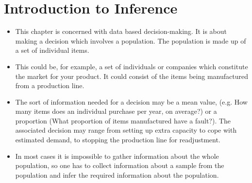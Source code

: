 \section{Introduction to Inference}
\begin{itemize}
\item This chapter is concerned with data based decision-making. It is about making a
decision which involves a population. The population is made up of a set of
individual items. 
\item This could be, for example, a set of individuals or companies which
constitute the market for your product. It could consist of the items being
manufactured from a production line.\\
\item The sort of information needed for a decision may be a mean value, (e.g. How many
items does an individual purchase per year, on average?) or a proportion (What
proportion of items manufactured have a fault?). The associated decision may range
from setting up extra capacity to cope with estimated demand, to stopping the
production line for readjustment.\\
\item In most cases it is impossible to gather information about the whole population, so
one has to collect information about a sample from the population and infer the
required information about the population.\\
\end{itemize}


